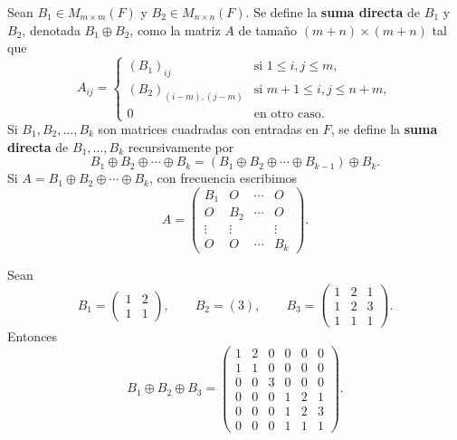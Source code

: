 \documentclass[12pt,a4paper]{book}
\begin{document}
    \begin{definicion}
        Sean $B_1\in M_{m\times m}(F)$ y $B_2\in M_{n\times n}(F)$. Se define la \textbf{suma directa} de $B_1$ y $B_2$, denotada $B_1\oplus B_2$, como la matriz $A$ de tamaño $(m+n)\times(m+n)$ tal que
        \begin{equation*}
            A_{ij}=
            \begin{cases}
                (B_1)_{ij} & \text{si } 1\leq i,j\leq m,\\
                (B_2)_{(i-m),(j-m)} & \text{si } m+1\leq i,j\leq n+m,\\
                0 & \text{en otro caso.}
            \end{cases}
        \end{equation*}
        Si $B_1,B_2,\dots,B_k$ son matrices cuadradas con entradas en $F$, se define la \textbf{suma directa} de $B_1,\dots,B_k$ recursivamente por
        \begin{equation*}
            B_1\oplus B_2\oplus\cdots\oplus B_k=(B_1\oplus B_2\oplus\cdots\oplus B_{k-1})\oplus B_k.
        \end{equation*}
        Si $A=B_1\oplus B_2\oplus\cdots\oplus B_k$, con frecuencia escribimos
        \begin{equation*}
            A=\begin{pmatrix}B_1&O&\cdots&O\\O&B_2&\cdots&O\\\vdots&\vdots&&\vdots\\O&O&\cdots&B_k\end{pmatrix}.
        \end{equation*}
    \end{definicion}

    \begin{ejemplo}
        Sean
        \begin{equation*}
            B_1=\begin{pmatrix}1&2\\1&1\end{pmatrix}, \qquad B_2=(3), \qquad B_3=\begin{pmatrix}1&2&1\\1&2&3\\1&1&1\end{pmatrix}.
        \end{equation*}
        Entonces
        \begin{equation*}
            B_1\oplus B_2\oplus B_3=
            \left(\begin{array}{cc|c|ccc}
                1&2&0&0&0&0\\
                1&1&0&0&0&0\\
                \hline
                0&0&3&0&0&0\\
                \hline
                0&0&0&1&2&1\\
                0&0&0&1&2&3\\
                0&0&0&1&1&1
            \end{array}\right).
        \end{equation*}
    \end{ejemplo}
\end{document}
